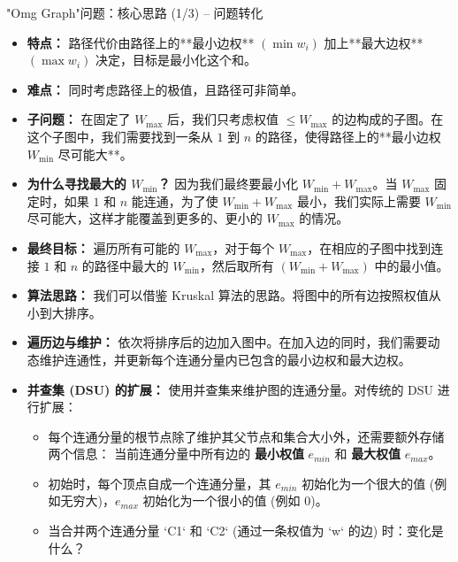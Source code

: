 \documentclass[11pt]{beamer}
\begin{document}
\begin{frame}
    "Omg Graph"问题：核心思路 (1/3) -- 问题转化
    \begin{itemize}
        \item \textbf{特点：} 路径代价由路径上的**最小边权** $(\min w_i)$ 加上**最大边权** $(\max w_i)$ 决定，目标是最小化这个和。
        \item \textbf{难点：} 同时考虑路径上的极值，且路径可非简单。
    \end{itemize}
\end{frame}

\begin{frame}
    \begin{itemize}
        \item \textbf{子问题：} 在固定了 $W_{\max}$ 后，我们只考虑权值 $\le W_{\max}$ 的边构成的子图。在这个子图中，我们需要找到一条从 $1$ 到 $n$ 的路径，使得路径上的**最小边权 $W_{\min}$ 尽可能大**。
        \item \textbf{为什么寻找最大的 $W_{\min}$？} 因为我们最终要最小化 $W_{\min} + W_{\max}$。当 $W_{\max}$ 固定时，如果 $1$ 和 $n$ 能连通，为了使 $W_{\min} + W_{\max}$ 最小，我们实际上需要 $W_{\min}$ 尽可能大，这样才能覆盖到更多的、更小的 $W_{\max}$ 的情况。
        \item \textbf{最终目标：} 遍历所有可能的 $W_{\max}$，对于每个 $W_{\max}$，在相应的子图中找到连接 $1$ 和 $n$ 的路径中最大的 $W_{\min}$，然后取所有 $(W_{\min} + W_{\max})$ 中的最小值。
    \end{itemize}
\end{frame}

\begin{frame}
    \begin{itemize}
        \item \textbf{算法思路：} 我们可以借鉴 Kruskal 算法的思路。将图中的所有边按照权值从小到大排序。
        \item \textbf{遍历边与维护：} 依次将排序后的边加入图中。在加入边的同时，我们需要动态维护连通性，并更新每个连通分量内已包含的最小边权和最大边权。
        \item \textbf{并查集 (DSU) 的扩展：} 使用并查集来维护图的连通分量。对传统的 DSU 进行扩展：
        \begin{itemize}
            \item 每个连通分量的根节点除了维护其父节点和集合大小外，还需要额外存储两个信息：
                当前连通分量中所有边的 \textbf{最小权值} $e_{min}$ 和 \textbf{最大权值} $e_{max}$。
            \item 初始时，每个顶点自成一个连通分量，其 $e_{min}$ 初始化为一个很大的值 (例如无穷大)，$e_{max}$ 初始化为一个很小的值 (例如 0)。
            \item 当合并两个连通分量 `C1` 和 `C2` (通过一条权值为 `w` 的边) 时：变化是什么？
        \end{itemize}
    \end{itemize}
\end{frame}
\end{document}
